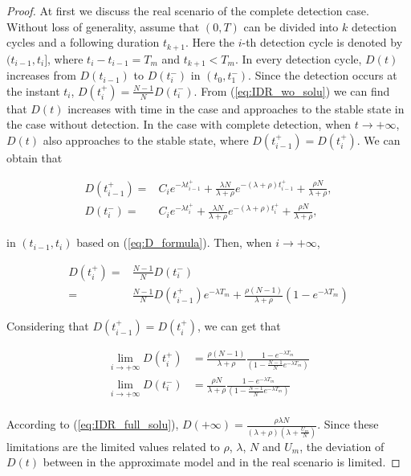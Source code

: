 \begin{lem}
\begin{proof}
At first we discuss the real scenario of the complete detection case.
Without loss of generality,
assume that $(0, T)$ can be divided into $k$ detection cycles
and a following duration $t_{k+1}$.
Here the $i$-th detection cycle is denoted by $(t_{i-1}, t_{i}]$,
where $t_{i} - t_{i-1} = T_{m}$ and $t_{k+1} < T_{m}$.
In every detection cycle,
$D(t)$ increases from $D(t_{i-1})$ to $D(t_{i}^{-})$
in $(t_{0}, t_{1}^{-})$.
Since the detection occurs at the instant $t_{i}$,
$D(t_{i}^{+}) = \frac{N-1}{N}D(t_{i}^{-})$.
From (\ref{eq:IDR_wo_solu}) we can find that $D(t)$ increases with time in the case
and approaches to the stable state in the case without detection.
In the case with complete detection,
when $t \rightarrow +\infty$,
$D(t)$ also approaches to the stable state,
where $D(t_{i-1}^{+}) = D(t_{i}^{+})$.
We can obtain that
\begin{small}
\begin{equation}
\nonumber
\begin{aligned}
D(t_{i-1}^{+}) = & C_{i} e^{-\lambda t_{i-1}^{+}}
+ \frac{\lambda N}{\lambda + \rho} e^{-(\lambda+\rho)t_{i-1}^{+}}
+ \frac{\rho N}{\lambda+\rho}, \\
D(t_{i}^{-}) = & C_{i} e^{-\lambda t_{i}^{+}}
+ \frac{\lambda N}{\lambda + \rho} e^{-(\lambda+\rho)t_{i}^{+}}
+ \frac{\rho N}{\lambda+\rho},
\end{aligned}
\end{equation}
\end{small}
in $(t_{i-1}, t_{i})$ based on (\ref{eq:D_formula}).
Then, when $i \rightarrow +\infty$,
\begin{small}
\begin{equation}
\nonumber
\begin{aligned}
D(t_{i}^{+}) =& \frac{N-1}{N} D(t_{i}^{-}) \\
=& \frac{N-1}{N} D(t_{i-1}^{+}) e^{-\lambda T_{m}}
+ \frac{\rho (N-1)}{\lambda + \rho} (1 - e^{-\lambda T_{m}})
\end{aligned}
\end{equation}
\end{small}
Considering that $D(t_{i-1}^{+}) = D(t_{i}^{+})$, we can get that
\begin{small}
\begin{equation}
\nonumber
\begin{aligned}
\lim_{i \rightarrow +\infty} D(t_{i}^{+}) &=
\frac{\rho(N-1)}{\lambda+\rho} \frac{1 - e^{-\lambda T_{m}}}
{(1 - \frac{N-1}{N}e^{-\lambda T_{m}})} \\
\lim_{i \rightarrow +\infty} D(t_{i}^{-}) &=
\frac{\rho N}{\lambda+\rho} \frac{1 - e^{-\lambda T_{m}}}
{(1 - \frac{N-1}{N}e^{-\lambda T_{m}})} \\
\end{aligned}
\end{equation}
\end{small}
According to (\ref{eq:IDR_full_solu}),
$D(+\infty) = \frac{\rho \lambda N}
{(\lambda + \rho)(\lambda + \frac{U_{m}}{N})}$.
Since these limitations are the limited values related to
$\rho$, $\lambda$, $N$ and $U_{m}$,
the deviation of $D(t)$ between in the approximate model and in the real scenario is limited.
\end{proof}


\end{lem}
